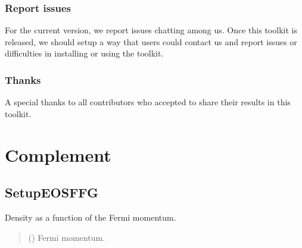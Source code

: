\documentclass[letterpaper,10pt,english]{sphinxmanual}
\begin{document}
\subsection{Report issues}
\label{\detokenize{source/miscelaneous:report-issues}}\label{\detokenize{source/miscelaneous:id3}}
\sphinxAtStartPar
For the current version, we report issues chatting among us.
Once this toolkit is released, we should setup a way that users could contact us and report issues or difficulties in installing or using the toolkit.


\subsection{Thanks}
\label{\detokenize{source/miscelaneous:thanks}}\label{\detokenize{source/miscelaneous:id4}}
\sphinxAtStartPar
A special thanks to all contributors who accepted to share their results in this toolkit.


\chapter{Complement}
\label{\detokenize{index:complement}}
\sphinxstepscope


\section{SetupEOSFFG}
\label{\detokenize{source/api/setup_matter_ffg:setupeosffg}}\label{\detokenize{source/api/setup_matter_ffg::doc}}\label{\detokenize{source/api/setup_matter_ffg:module-nucleardatapy.matter.setup_ffg}}

\begin{fulllineitems}
\label{\detokenize{source/api/setup_matter_ffg:nucleardatapy.matter.setup_ffg.den}}
\pysigstartsignatures
{}
\pysigstopsignatures
\sphinxAtStartPar
Density as a function of the Fermi momentum.
\begin{quote}\begin{description}
\sphinxAtStartPar
{} () \textendash{} Fermi momentum.

\end{description}\end{quote}

\end{fulllineitems}
\end{document}
